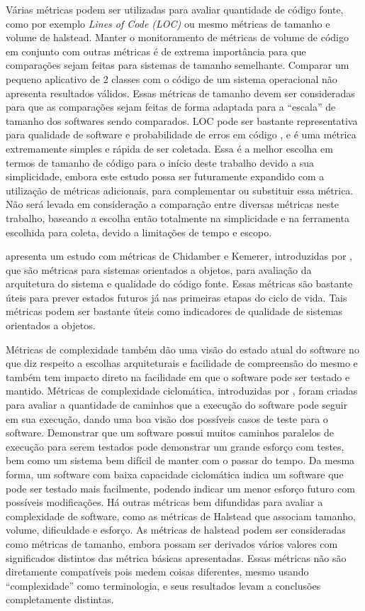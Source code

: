 Várias métricas podem ser utilizadas para avaliar quantidade de código fonte, como por exemplo \textit{Lines of Code (LOC)} ou mesmo métricas de tamanho e volume de halstead. Manter o monitoramento de métricas de volume de código em conjunto com outras métricas é de extrema importância para que comparações sejam feitas para sistemas de tamanho semelhante. Comparar um pequeno aplicativo de 2 classes com o código de um sistema operacional não apresenta resultados válidos. Essas métricas de tamanho devem ser consideradas para que as comparações sejam feitas de forma adaptada para a ``escala'' de tamanho dos softwares sendo comparados. LOC pode ser bastante representativa para qualidade de software e probabilidade de erros em código \cite{validationmetricsfaultprediction}, e é uma métrica extremamente simples e rápida de ser coletada. Essa é a melhor escolha em termos de tamanho de código para o início deste trabalho devido a sua simplicidade, embora este estudo possa ser futuramente expandido com a utilização de métricas adicionais, para complementar ou substituir essa métrica. Não será levada em consideração a comparação entre diversas métricas neste trabalho, baseando a escolha então totalmente na simplicidade e na ferramenta escolhida para coleta, devido a limitações de tempo e escopo.

 apresenta um estudo com métricas de Chidamber e Kemerer, introduzidas por , que são métricas para sistemas orientados a objetos, para avaliação da arquitetura do sistema e qualidade do código fonte. Essas métricas são bastante úteis para prever estados futuros já nas primeiras etapas do ciclo de vida. Tais métricas podem ser bastante úteis como indicadores de qualidade de sistemas orientados a objetos\cite{ooasqualityindicators}. 

Métricas de complexidade também dão uma visão do estado atual do software no que diz respeito a escolhas arquiteturais e facilidade de compreensão do mesmo e também tem impacto direto na facilidade em que o software pode ser testado e mantido. Métricas de complexidade ciclomática, introduzidas por , foram criadas para avaliar a quantidade de caminhos que a execução do software pode seguir em sua execução, dando uma boa visão dos possíveis casos de teste para o software. Demonstrar que um software possui muitos caminhos paralelos de execução para serem testados pode demonstrar um grande esforço com testes, bem como um sistema bem difícil de manter com o passar do tempo. Da mesma forma, um software com baixa capacidade ciclomática indica um software que pode ser testado mais facilmente, podendo indicar um menor esforço futuro com possíveis modificações. Há outras métricas bem difundidas para avaliar a complexidade de software, como as métricas de Halstead que associam tamanho, volume, dificuldade e esforço. As métricas de halstead podem ser consideradas como métricas de tamanho, embora possam ser derivados vários valores com significados distintos das métrica básicas apresentadas. Essas métricas não são diretamente compatíveis pois medem coisas diferentes, mesmo usando ``complexidade'' como terminologia, e seus resultados levam a conclusões completamente distintas.

